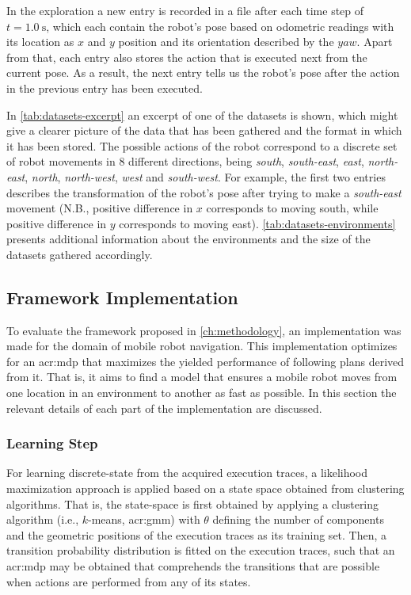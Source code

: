 In the exploration a new entry is recorded in a file after each time step of $t = \SI{1.0}{\second}$, which each contain the robot's pose based on odometric readings with its location as $x$ and $y$ position and its orientation described by the $yaw$.
Apart from that, each entry also stores the action that is executed next from the current pose.
As a result, the next entry tells us the robot's pose after the action in the previous entry has been executed.

In \autoref{tab:datasets-excerpt} an excerpt of one of the datasets is shown, which might give a clearer picture of the data that has been gathered and the format in which it has been stored.
The possible actions of the robot correspond to a discrete set of robot movements in $8$ different directions, being \textit{south}, \textit{south-east}, \textit{east}, \textit{north-east}, \textit{north}, \textit{north-west}, \textit{west} and \textit{south-west}.
For example, the first two entries describes the transformation of the robot's pose after trying to make a \textit{south-east} movement (N.B., positive difference in $x$ corresponds to moving south, while positive difference in $y$ corresponds to moving east).
\autoref{tab:datasets-environments} presents additional information about the environments and the size of the datasets gathered accordingly.


\subsection{Framework Implementation}
\label{sec:implementation}

To evaluate the framework proposed in \autoref{ch:methodology}, an implementation was made for the domain of mobile robot navigation.
This implementation optimizes for an \acrshort{acr:mdp} that maximizes the yielded performance of following plans derived from it. That is, it aims to find a model that ensures a mobile robot moves from one location in an environment to another as fast as possible.
In this section the relevant details of each part of the implementation are discussed.

\subsubsection{Learning Step}

For learning discrete-state  from the acquired execution traces, a likelihood maximization approach is applied based on a state space obtained from clustering algorithms.
That is, the state-space is first obtained by applying a clustering algorithm (i.e., $k$-means, \acrshort{acr:gmm}) with $\theta$ defining the number of components and the geometric positions of the execution traces as its training set.
Then, a transition probability distribution is fitted on the execution traces, such that an \acrshort{acr:mdp} may be obtained that comprehends the transitions that are possible when actions are performed from any of its states.

